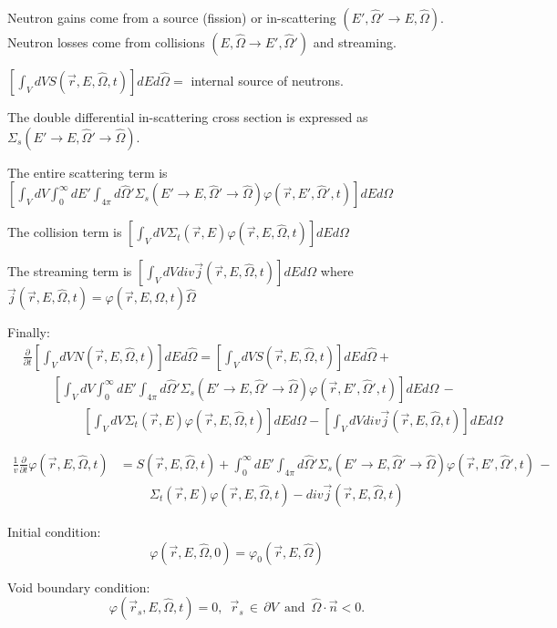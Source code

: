 \documentclass[12pt]{article}
\newcommand{\rvec}{\ensuremath{\vec{r}}}
\newcommand{\omvec}{\ensuremath{\hat{\Omega}}}
\begin{document}
Neutron gains come from a source (fission) or in-scattering $(E', \omvec' \rightarrow E, \omvec)$. Neutron losses come from collisions $(E, \omvec \rightarrow E', \omvec')$ and streaming.

$\left[\int_V dV S(\rvec, E, \omvec, t)\right] dEd\omvec =$ internal source of neutrons.

The double differential in-scattering cross section is expressed as $\Sigma_s(E'\rightarrow E, \omvec'\rightarrow\omvec)$.

The entire scattering term is
$\left[\int_VdV\int_0^{\infty}dE'\int_{4\pi}d\omvec'\Sigma_s(E'\rightarrow E,\omvec'\rightarrow\omvec)\varphi(\rvec,E',\omvec',t)\right]dEd\Omega$

The collision term is
$\left[\int_VdV\Sigma_{t}(\rvec,E)\varphi(\rvec,E,\omvec,t)\right]dEd\Omega$

The streaming term is
$\left[\int_VdV div \vec{j}(\rvec, E, \omvec,t)\right]dEd\Omega$ where $\vec{j}(\rvec,E,\omvec,t)=\varphi(\rvec,E,\omvec,t)\omvec$

Finally:
\begin{align*}
&\frac{\partial}{\partial t}\left[\int_V dV N(\rvec, E, \omvec, t)\right] dEd\omvec =
\left[\int_V dV S(\rvec, E, \omvec, t)\right] dEd\omvec +
\\& \hspace{1cm} \left[\int_VdV\int_0^{\infty}dE'\int_{4\pi}d\omvec'\Sigma_s(E'\rightarrow E,\omvec'\rightarrow\omvec)\varphi(\rvec,E',\omvec',t)\right]dEd\Omega \,-
\\& \hspace{2cm}\left[\int_VdV\Sigma_{t}(\rvec,E)\varphi(\rvec,E,\omvec,t)\right]dEd\Omega - \left[\int_VdV div \vec{j}(\rvec, E, \omvec,t)\right]dEd\Omega
\end{align*}

\begin{align*}
\frac{1}{v}\frac{\partial}{\partial t}\varphi(\rvec, E, \omvec, t) &=
 S(\rvec, E, \omvec, t) +
 \int_0^{\infty}dE'\int_{4\pi}d\omvec'\Sigma_s(E'\rightarrow E,\omvec'\rightarrow\omvec)\varphi(\rvec,E',\omvec',t) \,-
\\& \hspace{1cm}\Sigma_{t}(\rvec,E)\varphi(\rvec,E,\omvec,t) - div \vec{j}(\rvec, E, \omvec,t)
\end{align*}

Initial condition:
\[
\varphi(\rvec, E, \omvec, 0) = \varphi_0(\rvec, E,\omvec)
\]

Void boundary condition:
\[
\varphi(\rvec_s, E, \omvec, t) = 0, \,\,\, \rvec_s \, \in \, \partial V \,\,\, \text{and} \,\,\, \omvec \cdot \vec{n} <0.
\]
\end{document}
